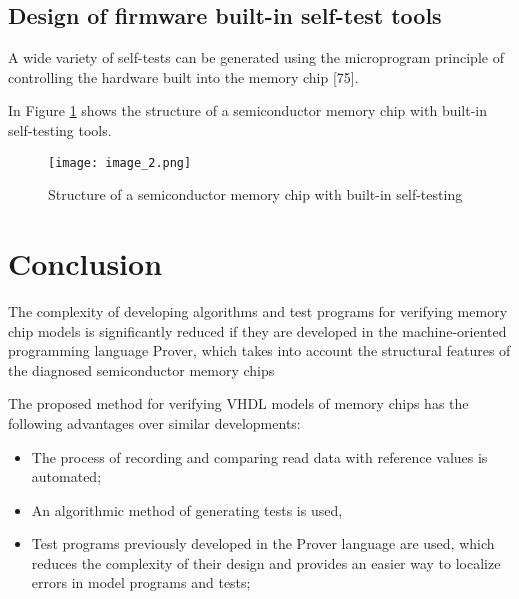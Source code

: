 \documentclass[12pt]{article}
\begin{document}
\subsection{Design of firmware built-in self-test tools}

A wide variety of self-tests can be generated using the microprogram principle of controlling the hardware built into the memory chip [75].

In Figure \ref{figure_2} shows the structure of a semiconductor memory chip with built-in self-testing tools.

\begin{figure}[h]
    \centering
    \texttt{[image: image\_2.png]}
    \caption{Structure of a semiconductor memory chip with built-in self-testing }
    \label{figure_2}
\end{figure}

\newpage
\section{Conclusion}

The complexity of developing algorithms and test programs for verifying memory chip models is significantly reduced if they are developed in the machine-oriented programming language Prover, which takes into account the structural features of the diagnosed semiconductor memory chips


The proposed method for verifying VHDL models of memory chips has the following advantages over similar developments:

\begin{itemize}
  \item {The process of recording and comparing read data with reference values is automated;}
  \item An algorithmic method of generating tests is used,
  \item Test programs previously developed in the Prover language are used, which reduces the complexity of their design and provides an easier way to localize errors in model programs and tests;
\end{itemize}
\end{document}
